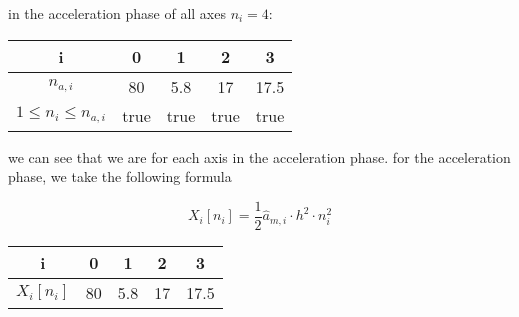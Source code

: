 \documentclass[professionalfonts, 
               xcolor={ usenames, %
                        dvipsnames,%
                        svgnames,%
                        table,%
                        hyperref%
                      }
              ]{beamer}
\begin{document}
\begin{frame}
in the acceleration phase of all axes $n_i = 4$:

\begin{center}
\begin{tabular}{ccccc}
\toprule
i & 0 & 1 & 2 & 3 \\
\midrule
$n_{a,i}$ & 80 & 5.8 & 17 & 17.5 \\ 
$1 \leq n_{i} \leq n_{a,i}$ & true & true & true & true \\
\bottomrule
\end{tabular}
\end{center}

we can see that we are for each axis in the acceleration phase. for the acceleration phase, we take the following formula

\begin{equation*}
X_{i}[n_{i}] = \frac{1}{2} \hat{a}_{m,i} \cdot h^2 \cdot n_{i}^2
\end{equation*}

\begin{center}
\begin{tabular}{ccccc}
\toprule
i & 0 & 1 & 2 & 3 \\
\midrule
$X_{i}[n_{i}]$ & 80 & 5.8 & 17 & 17.5 \\
\bottomrule
\end{tabular}
\end{center}
\end{frame}
\end{document}
